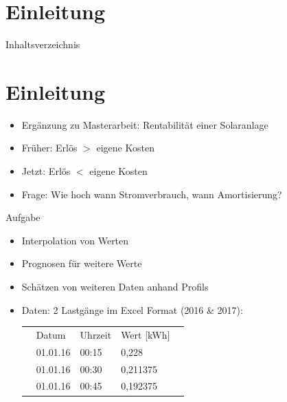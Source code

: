 
\section{Einleitung}
\begin{frame}{Inhaltsverzeichnis}
\tableofcontents[currentsection]
\end{frame}



\section{Einleitung}
\begin{frame}{\insertsectionhead}
	\begin{itemize}
		\item Ergänzung zu Masterarbeit: Rentabilität einer Solaranlage
		\item Früher: Erlös $>$ eigene Kosten
		\item Jetzt: Erlös $<$ eigene Kosten
		\item Frage: Wie hoch wann Stromverbrauch, wann Amortisierung?
	\end{itemize}
\end{frame}

\begin{frame}{Aufgabe}
\begin{itemize}
	\item Interpolation von Werten
	\item Prognosen für weitere Werte
	\item Schätzen von weiteren Daten anhand Profils
	\bigskip
	\item Daten: 2 Lastgänge im Excel Format (2016 \& 2017):
	
\begin{table}[]
	\begin{tabular}{lllll}
		& Datum    & Uhrzeit & Wert [kWh] &  \\
		& 01.01.16 & 00:15   & 0,228      &  \\
		& 01.01.16 & 00:30   & 0,211375   &  \\
		& 01.01.16 & 00:45   & 0,192375   & 
	\end{tabular}
\end{table}
	
\end{itemize}
\end{frame}


